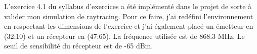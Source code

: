 L'exercice 4.1 du syllabus d'exercices a été implémenté dans le projet de sorte à valider mon simulation de raytracing. Pour ce faire, j'ai redéfini l'environnement en respectant les dimensions de l'exercice et j'ai également placé un émetteur en (32;10) et un récepteur en (47;65). La fréquence utilisée est de 868.3 MHz. Le seuil de sensibilité du récepteur est de -65 dBm.




